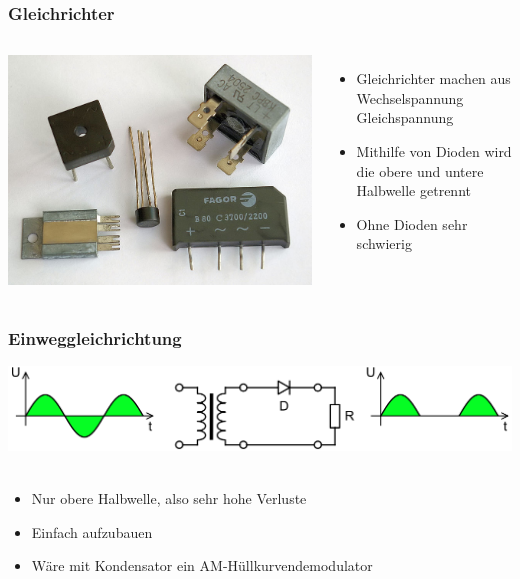 \begin{frame}
    \frametitle{Gleichrichter}
    \begin{columns}[c]
        \column[c]{5cm}
        \begin{center}
            \includegraphics[width=1\textwidth]{a05/Brueckengleichrichter_Bilder.jpg}\\
            \tiny \hyperlink{refs}{\cite{wm}}
        \end{center}
        \column{5cm}
    \begin{itemize}
			\item Gleichrichter machen aus Wechselspannung Gleichspannung
			\item Mithilfe von Dioden wird die obere und untere Halbwelle getrennt
			\item Ohne Dioden sehr schwierig
    \end{itemize}
    \end{columns}
\end{frame}

\begin{frame}
    \frametitle{Einweggleichrichtung}
    \begin{center}
    	\includegraphics[width=1\textwidth]{a05/Halfwave_rectifier.png}\\
        \tiny \hyperlink{refs}{\cite{wm}} \\[1em] \large
        \begin{itemize}
			\item Nur obere Halbwelle, also sehr hohe Verluste
			\item Einfach aufzubauen
			\item Wäre mit Kondensator ein AM-Hüllkurvendemodulator
    	\end{itemize}
 	\end{center}
\end{frame}

